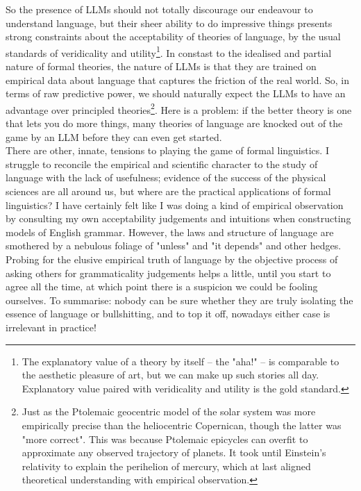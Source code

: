 So the presence of LLMs should not totally discourage our endeavour to understand language, but their sheer ability to do impressive things presents strong constraints about the acceptability of theories of language, by the usual standards of veridicality and utility\footnote{The explanatory value of a theory by itself -- the "aha!" -- is comparable to the aesthetic pleasure of art, but we can make up such stories all day. Explanatory value paired with veridicality and utility is the gold standard.}. In constast to the idealised and partial nature of formal theories, the nature of LLMs is that they are trained on empirical data about language that captures the friction of the real world. So, in terms of raw predictive power, we should naturally expect the LLMs to have an advantage over principled theories\footnote{Just as the Ptolemaic geocentric model of the solar system was more empirically precise than the heliocentric Copernican, though the latter was "more correct". This was because Ptolemaic epicycles can overfit to approximate any observed trajectory of planets. It took until Einstein's relativity to explain the perihelion of mercury, which at last aligned theoretical understanding with empirical observation.}. Here is a problem: if the better theory is one that lets you do more things, many theories of language are knocked out of the game by an LLM before they can even get started.\\

There are other, innate, tensions to playing the game of formal linguistics. I struggle to reconcile the empirical and scientific character to the study of language with the lack of usefulness; evidence of the success of the physical sciences are all around us, but where are the practical applications of formal linguistics? I have certainly felt like I was doing a kind of empirical observation by consulting my own acceptability judgements and intuitions when constructing models of English grammar. However, the laws and structure of language are smothered by a nebulous foliage of "unless" and "it depends" and other hedges. Probing for the elusive empirical truth of language by the objective process of asking others for grammaticality judgements helps a little, until you start to agree all the time, at which point there is a suspicion we could be fooling ourselves. To summarise: nobody can be sure whether they are truly isolating the essence of language or bullshitting, and to top it off, nowadays either case is irrelevant in practice!\\

